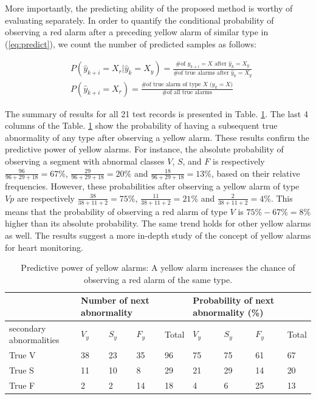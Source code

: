 More importantly, the predicting ability of the proposed method is worthy of evaluating separately. In order to quantify the conditional probability of observing a red alarm after a preceding yellow alarm of similar type in (\ref{eq:predict}), we count the number of predicted samples as follows:

\begin{align}
\nonumber 
&P(\hat{y}_{k+i}=X_r|\hat{y}_{k}=X_y)=\frac{\text{\# of $y_{k+i}=X$ after $\hat{y}_k=X_y$}}{\text{\# of true alarms after $\hat{y}_k=X_y$}} \\
&P(\hat{y}_{k+i}=X_r)=\frac{\text{\# of true alarm of type $X$ ($y_{k}=X$)}}{\text{\# of all true alarms}} 
\end{align}

The summary of results for all 21 test records is presented in Table. \ref{table:pred}. The last 4 columns of the Table. \ref{table:pred} show the probability of having a subsequent true abnormality of any type after observing a yellow alarm. %
These results confirm the predictive power of yellow alarms. 
For instance, the absolute probability of observing a segment with abnormal classes $V$, $S$, and $F$ is respectively $\frac{96}{96+29+18}=67\%$, $\frac{29}{96+29+18}=20\%$ and $\frac{18}{96+29+18}=13\%$, based on their relative frequencies. However, these probabilities after observing a yellow alarm of type $Vp$ are respectively $\frac{38}{38+11+2}=75\%$, $\frac{11}{38+11+2}=21\%$ and $\frac{2}{38+11+2}=4\%$. This means that the probability of observing a red alarm of type $V$ is $75\%-67\%=8\%$ higher than its absolute probability. The same trend holds for other yellow alarms as well. The results suggest a more in-depth study of the concept of yellow alarms for heart monitoring.

\begin{table}
	\caption{Predictive power of yellow alarms: A yellow alarm increases the chance of observing a red alarm of the same type.}
	\centering
	\begin{tabular}{|m{3.5em}|| m{1.4em} || m{1.4em} || m{1.4em} ||m{1.4em}|| m{1.4em} || m{1.4em} || m{1.4em} || m{1.4em}|}
		\hline
		& \multicolumn{3}{m{8em}}{Number of next abnormality }& &\multicolumn{3}{m{8em}}{Probability of next abnormality (\%)}  & \\ 
		\hline 
		secondary abnormalities & $V_y$ & $S_y$ & $F_y$ & Total & $V_y$ & $S_y$ & $F_y$ & Total \\ 
		\hline 
		True V & 38 & 23 & 35& 96 & 75 & 75 & 61 & 67 \\ 
		\hline 
		True S & 11 & 10 & 8 & 29 & 21 & 29 & 14& 20 \\ 
		\hline 
		True F & 2 & 2 & 14 & 18 & 4 & 6 & 25 & 13 \\ 
		\hline 
	\end{tabular} 
	\label{table:pred}
\end{table}


